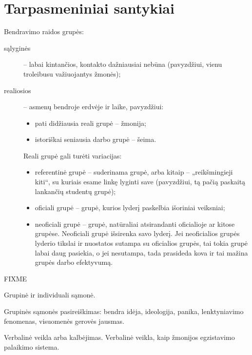 \chapter{Tarpasmeniniai santykiai}

Bendravimo raidos grupės:

\begin{description}
  \item[sąlyginės] – labai kintančios, kontakto dažniausiai nebūna 
    (pavyzdžiui, vienu troleibusu važiuojantys žmonės);
  \item[realiosios] – asmenų bendroje erdvėje ir laike, pavyzdžiui:
    \begin{itemize}
      \item pati didžiausia reali grupė – žmonija;
      \item istoriškai seniausia darbo grupė – šeima.
    \end{itemize}

    Reali grupė gali turėti variacijas:
    \begin{itemize}
      \item referentinė grupė – suderinama grupė, arba kitaip –
        „reikšmingieji kiti“, su kuriais esame linkę lyginti save 
        (pavyzdžiui, tą pačią paskaitą lankančių studentų grupė);
      \item oficiali grupė – grupė, kurios lyderį paskelbia išoriniai
        veiksniai;
      \item neoficiali grupė – grupė, natūraliai atsirandanti oficialioje
        ar kitose grupėse. Neoficiali grupė išsirenka savo lyderį. Jei
        neoficialios grupės lyderio tikslai ir nuostatos sutampa su
        oficialios grupės, tai tokia grupė labai daug pasiekia, o jei
        nesutampa, tada prasideda kova ir tai mažina grupės darbo 
        efektyvumą.
    \end{itemize}

\end{description}


FIXME

Grupinė ir individuali sąmonė.

Grupinės sąmonės pasireiškimas: bendra idėja, ideologija,
panika, lenktyniavimo fenomenas, visuomenės gerovės jausmas.

Verbalinė veikla arba kalbėjimas. Verbalinė veikla, kaip žmonijos 
egzistavimo palaikimo sistema.

